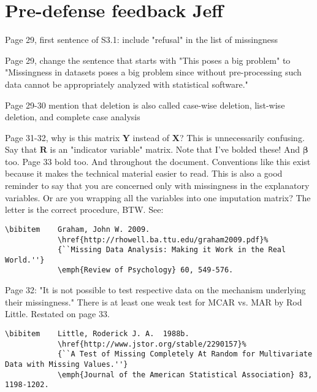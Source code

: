 \documentclass[12pt]{article}
\begin{document}
\section*{Pre-defense feedback Jeff}
	\begin{coi}
		\item Page 29, first sentence of S3.1: include "refusal" in the list of missingness
		\item Page 29, change the sentence that starts with "This poses a big problem" to "Missingness in datasets poses a big problem since without pre-processing such data cannot be appropriately analyzed with statistical software."
		\item Page 29-30 mention that deletion is also called case-wise deletion, list-wise deletion, and complete case analysis
		\item Page 31-32, why is this matrix $\mathbf{Y}$ instead of $\mathbf{X}$? This is unnecessarily confusing. Say that $\mathbf{R}$ is an "indicator variable" matrix. Note that I've bolded these! And $\boldsymbol{\beta}$ too. Page 33 bold too. And throughout the document. Conventions like this exist because it makes the technical material easier to read. This is also a good reminder to say that you are concerned only with missingness in the explanatory variables. Or are you wrapping all the variables into one imputation matrix? The letter is the correct procedure, BTW. See:
\begin{verbatim}
\bibitem    Graham, John W. 2009.
            \href{http://rhowell.ba.ttu.edu/graham2009.pdf}%
            {``Missing Data Analysis: Making it Work in the Real World.''}
            \emph{Review of Psychology} 60, 549-576.
\end{verbatim}
		\item Page 32: "It is not possible to test respective data on the mechanism underlying their missingness." There is at least one weak test for MCAR vs. MAR by Rod Little. Restated on page 33.
\begin{verbatim}
\bibitem    Little, Roderick J. A.  1988b.
            \href{http://www.jstor.org/stable/2290157}%
            {``A Test of Missing Completely At Random for Multivariate Data with Missing Values.''}
            \emph{Journal of the American Statistical Association} 83, 1198-1202.


\end{verbatim}
\end{coi}
\end{document}

